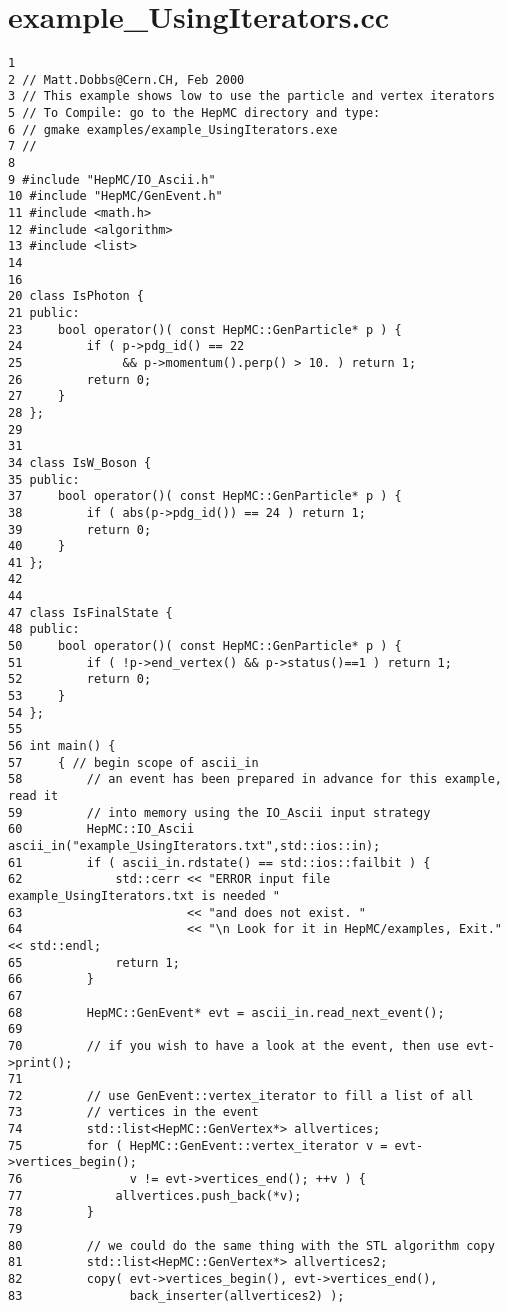 \section{example\_\-Using\-Iterators.cc}


\begin{DocInclude}\begin{verbatim}1 
2 // Matt.Dobbs@Cern.CH, Feb 2000
3 // This example shows low to use the particle and vertex iterators
5 // To Compile: go to the HepMC directory and type:
6 // gmake examples/example_UsingIterators.exe
7 //
8 
9 #include "HepMC/IO_Ascii.h"
10 #include "HepMC/GenEvent.h"
11 #include <math.h>
12 #include <algorithm>
13 #include <list>
14 
16 
20 class IsPhoton {
21 public:
23     bool operator()( const HepMC::GenParticle* p ) { 
24         if ( p->pdg_id() == 22 
25              && p->momentum().perp() > 10. ) return 1;
26         return 0;
27     }
28 };
29 
31 
34 class IsW_Boson {
35 public:
37     bool operator()( const HepMC::GenParticle* p ) { 
38         if ( abs(p->pdg_id()) == 24 ) return 1;
39         return 0;
40     }
41 };
42 
44 
47 class IsFinalState {
48 public:
50     bool operator()( const HepMC::GenParticle* p ) { 
51         if ( !p->end_vertex() && p->status()==1 ) return 1;
52         return 0;
53     }
54 };
55 
56 int main() {
57     { // begin scope of ascii_in
58         // an event has been prepared in advance for this example, read it
59         // into memory using the IO_Ascii input strategy
60         HepMC::IO_Ascii ascii_in("example_UsingIterators.txt",std::ios::in);
61         if ( ascii_in.rdstate() == std::ios::failbit ) {
62             std::cerr << "ERROR input file example_UsingIterators.txt is needed "
63                       << "and does not exist. "
64                       << "\n Look for it in HepMC/examples, Exit." << std::endl;
65             return 1;
66         }
67 
68         HepMC::GenEvent* evt = ascii_in.read_next_event();
69 
70         // if you wish to have a look at the event, then use evt->print();
71 
72         // use GenEvent::vertex_iterator to fill a list of all 
73         // vertices in the event
74         std::list<HepMC::GenVertex*> allvertices;
75         for ( HepMC::GenEvent::vertex_iterator v = evt->vertices_begin();
76               v != evt->vertices_end(); ++v ) {
77             allvertices.push_back(*v);
78         }
79 
80         // we could do the same thing with the STL algorithm copy
81         std::list<HepMC::GenVertex*> allvertices2;
82         copy( evt->vertices_begin(), evt->vertices_end(), 
83               back_inserter(allvertices2) );

\end{verbatim}
\end{DocInclude}
